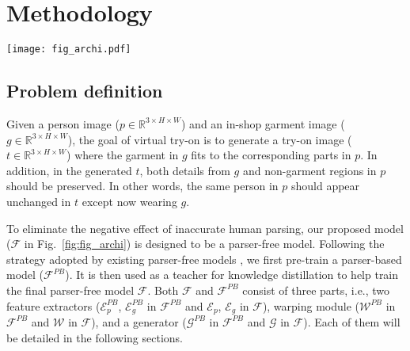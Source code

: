 \documentclass[10pt,twocolumn,letterpaper]{article}
\begin{document}
\section{Methodology}
\begin{figure*}[t!]
    \centering
    \texttt{[image: fig\_archi.pdf]}
    \caption{A schematic of our framework. The pre-trained parser based model $\mathcal{F}^{PB}$ generates an output image as the input of parser free model $\mathcal{F}$. The two feature extractors in $\mathcal{F}$ extract the feature of person image and garment image, respectively. A style vector is extracted from the lowest resolution feature maps from person image and the garment image. The warping module takes in the style vector and feature maps from the person image and garment image, and output an appearance flow map. The appearance flow is then used to warp the garment. Finally, the warped garment is concatenated with person image and fed into the generator to generate the target try-on image. Note that $\mathcal{F}_{PB}$ is only used during training.}
    \vspace{-0.4cm}
    \label{fig:fig_archi}
\end{figure*}

\subsection{Problem definition}

Given a person image ($p \in \mathbb{R} ^ {3\times H \times W}$) and an in-shop garment image ($g \in \mathbb{R} ^ {3 \times H \times W}$), the goal of virtual try-on is to generate a try-on image ($t \in \mathbb{R} ^ {3 \times H \times W}$) where the garment in $g$ fits to the corresponding parts in $p$. In addition, in the generated $t$, both details from $g$ and non-garment regions in $p$ should be preserved. In other words, the same person in $p$ should appear unchanged in $t$ except now wearing $g$.

To eliminate the negative effect of inaccurate human parsing, our proposed model ($\mathcal{F}$ in Fig.~\ref{fig:fig_archi}) is designed to be a parser-free model. Following the strategy adopted by existing parser-free models \cite{issenhuth2020not, ge2021parser}, we first pre-train a parser-based model ($\mathcal{F}^{PB}$). It is then used as a teacher for knowledge distillation to help train the final parser-free model $\mathcal{F}$. Both $\mathcal{F}$ and $\mathcal{F}^{PB}$ consist of three parts, i.e., two feature extractors ($\mathcal{E}_{p}^{PB}$, $\mathcal{E}_{g}^{PB}$ in $\mathcal{F}^{PB}$ and $\mathcal{E}_{p}$, $\mathcal{E}_{g}$ in $\mathcal{F}$), warping module ($\mathcal{W}^{PB}$ in $\mathcal{F}^{PB}$ and $\mathcal{W}$ in $\mathcal{F}$), and a generator ($\mathcal{G}^{PB}$ in $\mathcal{F}^{PB}$ and $\mathcal{G}$ in $\mathcal{F}$). Each of them will be detailed in the following sections.
\end{document}
